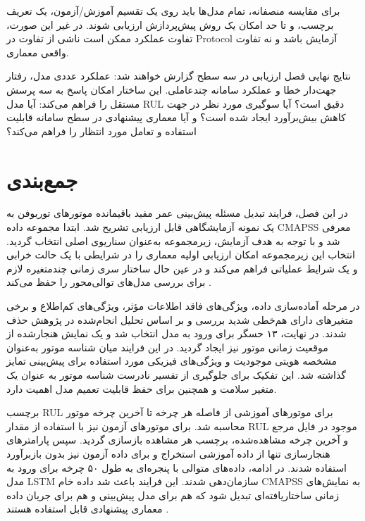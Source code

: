 \documentclass[a4paper,fleqn]{report}
\begin{document}
برای مقایسه منصفانه، تمام مدل‌ها باید روی یک تقسیم آموزش/آزمون،
یک تعریف برچسب، و تا حد امکان یک روش پیش‌پردازش ارزیابی شوند.
در غیر این صورت، تفاوت عملکرد ممکن است ناشی از تفاوت در \gls{Protocol}
آزمایش باشد و نه تفاوت واقعی معماری.

نتایج نهایی فصل ارزیابی در سه سطح گزارش خواهند شد: عملکرد عددی
مدل، رفتار جهت‌دار خطا و عملکرد سامانه چندعاملی. این ساختار
امکان پاسخ به سه پرسش مستقل را فراهم می‌کند: آیا مدل \gls{RUL}
دقیق است؟ آیا سوگیری مورد نظر در جهت کاهش بیش‌برآورد ایجاد شده
است؟ و آیا معماری پیشنهادی در سطح سامانه قابلیت استفاده و تعامل
مورد انتظار را فراهم می‌کند؟






\section{جمع‌بندی}
\label{sec:chap3-summary}

در این فصل، فرایند تبدیل مسئله پیش‌بینی عمر مفید باقیمانده موتورهای
توربوفن به یک نمونه آزمایشگاهی قابل ارزیابی تشریح شد. ابتدا مجموعه
داده \gls{CMAPSS} معرفی شد و با توجه به هدف آزمایش، زیرمجموعه
 به‌عنوان سناریوی اصلی انتخاب گردید. انتخاب این
زیرمجموعه امکان ارزیابی اولیه معماری را در شرایطی با یک حالت
خرابی و یک شرایط عملیاتی فراهم می‌کند و در عین حال ساختار
سری زمانی چندمتغیره لازم برای بررسی مدل‌های توالی‌محور را حفظ
می‌کند \cite{NASA2007C-MAPSS}.

در مرحله آماده‌سازی داده، ویژگی‌های فاقد اطلاعات مؤثر، ویژگی‌های
کم‌اطلاع و برخی متغیرهای دارای هم‌خطی شدید بررسی و بر اساس تحلیل
انجام‌شده در پژوهش حذف شدند. در نهایت، ۱۳ حسگر برای ورود به مدل
انتخاب شد و یک نمایش هنجارشده از موقعیت زمانی موتور نیز ایجاد
گردید. در این فرایند میان شناسه موتور به‌عنوان مشخصه هویتی
موجودیت و ویژگی‌های فیزیکی مورد استفاده برای پیش‌بینی تمایز
گذاشته شد. این تفکیک برای جلوگیری از تفسیر نادرست شناسه موتور به
عنوان یک متغیر سلامت و همچنین برای حفظ قابلیت تعمیم مدل اهمیت
دارد.

برچسب \gls{RUL} برای موتورهای آموزشی از فاصله هر چرخه تا آخرین
چرخه موتور محاسبه شد. برای موتورهای آزمون نیز با استفاده از مقدار
\gls{RUL} موجود در فایل مرجع و آخرین چرخه مشاهده‌شده، برچسب هر
مشاهده بازسازی گردید. سپس پارامترهای هنجارسازی تنها از داده
آموزشی استخراج و برای داده آزمون نیز بدون بازبرآورد استفاده
شدند. در ادامه، داده‌های متوالی با پنجره‌ای به طول ۵۰ چرخه برای
ورود به مدل \gls{LSTM} سازمان‌دهی شدند. این فرایند باعث شد داده
خام \gls{CMAPSS} به نمایش‌های زمانی ساختاریافته‌ای تبدیل شود که هم
برای مدل پیش‌بینی و هم برای جریان داده معماری پیشنهادی قابل
استفاده هستند \cite{heimes2008recurrent}.
\end{document}
